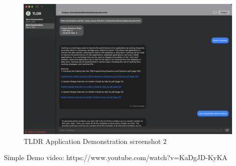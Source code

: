 \begin{figure}[h]
    \centering
    \includegraphics[width=1.0\linewidth]{images/result2.png}
    \caption{TLDR Application Demonstration screenshot 2}
    \label{fig:tldrmodulesinteraction}
\end{figure}

Simple Demo video: https://www.youtube.com/watch?v=KaDgJD-KyKA
